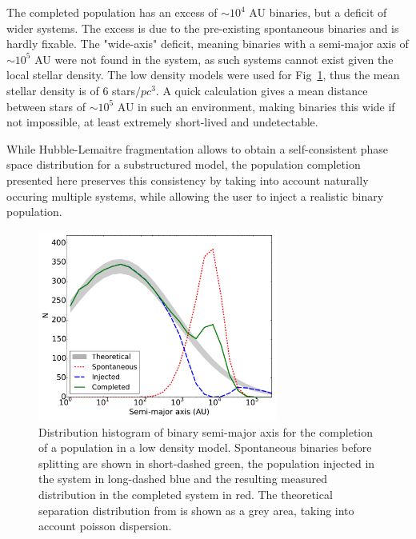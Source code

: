 The completed population has an excess of $\sim 10^4$ AU binaries, but a deficit of wider systems. The excess is due to the pre-existing spontaneous binaries and is hardly fixable. The "wide-axis" deficit, meaning binaries with a semi-major axis of $\sim 10^5$ AU were not found in the system,  as such systems cannot exist given the local stellar density. The low density models were used for Fig~\ref{Fig:5_completed_smaxis}, thus the mean stellar density is of 6 stars$/pc^3$. A quick calculation gives a mean distance between stars of $\sim 10^5$ AU in such an environment, making binaries this wide if not impossible, at least extremely short-lived and undetectable.

While Hubble-Lemaitre fragmentation allows to obtain a self-consistent phase space distribution for a substructured model, the population completion presented here preserves this consistency by taking into account naturally occuring multiple systems, while allowing the user to inject a realistic binary population.



\begin{figure}
\begin{center}
\includegraphics[width=0.7\textwidth]{Figures/5_completed_smaxis}
\caption{ Distribution histogram of binary semi-major axis for the completion of a population in a low density model. Spontaneous binaries before splitting are shown in short-dashed green, the population injected in the system in long-dashed blue and the resulting measured distribution in the completed system in red. The theoretical separation distribution from \protect\cite{Raghavan2010} is shown as a grey area, taking into account poisson dispersion.}
\label{Fig:5_completed_smaxis}
\end{center}
\end{figure}

